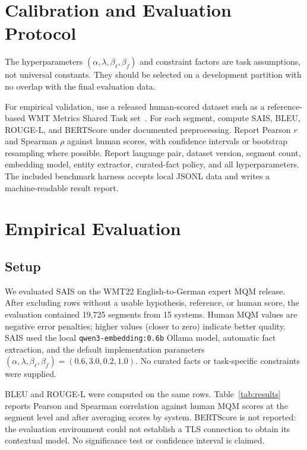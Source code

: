 \documentclass[11pt]{article}
\begin{document}
\section{Calibration and Evaluation Protocol}

The hyperparameters $(\alpha,\lambda,\beta_\ell,\beta_f)$ and constraint
factors are task assumptions, not universal constants. They should be selected
on a development partition with no overlap with the final evaluation data.

For empirical validation, use a released human-scored dataset such as a
reference-based WMT Metrics Shared Task set~\citep{freitag2022wmt}. For each
segment, compute SAIS, BLEU, ROUGE-L, and BERTScore under documented
preprocessing. Report Pearson $r$ and Spearman $\rho$ against human scores,
with confidence intervals or bootstrap resampling where possible. Report
language pair, dataset version, segment count, embedding model, entity
extractor, curated-fact policy, and all hyperparameters. The included benchmark
harness accepts local JSONL data and writes a machine-readable result report.

\section{Empirical Evaluation}

\subsection{Setup}

We evaluated SAIS on the WMT22 English-to-German expert MQM release. After
excluding rows without a usable hypothesis, reference, or human score, the
evaluation contained 19,725 segments from 15 systems. Human MQM values are
negative error penalties; higher values (closer to zero) indicate better
quality. SAIS used the local \texttt{qwen3-embedding:0.6b} Ollama model,
automatic fact extraction, and the default implementation parameters
$(\alpha,\lambda,\beta_\ell,\beta_f)=(0.6,3.0,0.2,1.0)$. No curated facts or
task-specific constraints were supplied.

BLEU and ROUGE-L were computed on the same rows. Table~\ref{tab:results}
reports Pearson and Spearman correlation against human MQM scores at the
segment level and after averaging scores by system. BERTScore is not reported:
the evaluation environment could not establish a TLS connection to obtain its
contextual model. No significance test or confidence interval is claimed.
\end{document}
